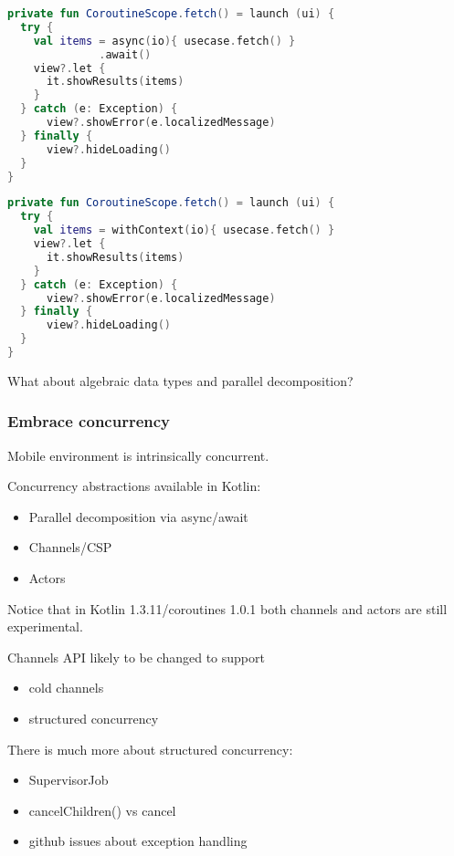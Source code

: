 \documentclass[10pt]{beamer}
\begin{document}
\begin{frame}[fragile]
\begin{lstlisting}[language=Kotlin, basicstyle=\ttfamily]
private fun CoroutineScope.fetch() = launch (ui) {
  try {
    val items = async(io){ usecase.fetch() }
              .await() 
    view?.let {
      it.showResults(items)
    }
  } catch (e: Exception) {
      view?.showError(e.localizedMessage)
  } finally {
      view?.hideLoading()
  }
}
\end{lstlisting}
\end{frame}
\begin{frame}[fragile]
\begin{lstlisting}[language=Kotlin, basicstyle=\ttfamily]
private fun CoroutineScope.fetch() = launch (ui) {
  try {
    val items = withContext(io){ usecase.fetch() }
    view?.let {
      it.showResults(items)
    }
  } catch (e: Exception) {
      view?.showError(e.localizedMessage)
  } finally {
      view?.hideLoading()
  }
}
\end{lstlisting}
\end{frame}


\begin{frame}[fragile]
What about algebraic data types and parallel decomposition?
\end{frame}


\begin{frame}[fragile]
\frametitle{Embrace concurrency}
Mobile environment is intrinsically concurrent.

Concurrency abstractions available in Kotlin:
\begin{itemize}
\item Parallel decomposition via async/await 
\item Channels/CSP 
\item Actors
\end{itemize}


\end{frame}
\begin{frame}[fragile]
Notice that in Kotlin 1.3.11/coroutines 1.0.1 both channels and actors are still experimental.

Channels API likely to be changed to support
\begin{itemize}
\item cold channels 
\item structured concurrency 
\end{itemize}
\end{frame}

\begin{frame}[fragile]
There is much more about structured concurrency:
\begin{itemize}
\item SupervisorJob
\item cancelChildren() vs cancel
\item github issues about exception handling 
\end{itemize}
\end{frame}
\end{document}
